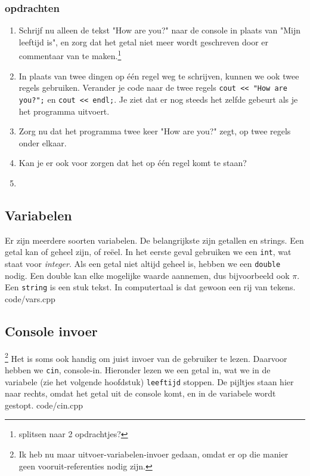 \documentclass[12pt,a4paper]{article}
\newcommand{\code}{}
\newcommand{\icode}{\lstinline}
\begin{document}
\subsubsection{opdrachten}
\begin{enumerate}
		\item
			Schrijf nu alleen de tekst "How are you?" naar de console in plaats van "Mijn leeftijd is", en zorg dat het getal niet meer wordt geschreven door er commentaar van te maken.\footnote{splitsen naar 2 opdrachtjes?}
		\item
			In plaats van twee dingen op \'e\'en regel weg te schrijven, kunnen we ook twee regels gebruiken. Verander je code naar de twee regels \icode{cout << "How are you?";} en \icode{cout << endl;}. Je ziet dat er nog steeds het zelfde gebeurt als je het programma uitvoert.
		\item
			Zorg nu dat het programma twee keer "How are you?" zegt, op twee regels onder elkaar.
		\item
			Kan je er ook voor zorgen dat het op \'e\'en regel komt te staan?
		\item
\end{enumerate}

\subsection{Variabelen}
Er zijn meerdere soorten variabelen. De belangrijkste zijn getallen en strings. Een getal kan of geheel zijn, of re\"eel. In het eerste geval gebruiken we een \icode{int}, wat staat voor \emph{integer}. Als een getal niet altijd geheel is, hebben we een \icode{double} nodig. Een double kan elke mogelijke waarde aannemen, dus bijvoorbeeld ook $\pi$.\\
Een \icode{string} is een stuk tekst. In computertaal is dat gewoon een rij van tekens.
\code{code/vars.cpp}
\subsection{Console invoer}\footnote{Ik heb nu maar uitvoer-variabelen-invoer gedaan, omdat er op die manier geen vooruit-referenties nodig zijn.}
Het is soms ook handig om juist invoer van de gebruiker te lezen. Daarvoor hebben we \icode{cin}, console-in. Hieronder lezen we een getal in, wat we in de variabele (zie het volgende hoofdstuk) \icode{leeftijd} stoppen. De pijltjes staan hier naar rechts, omdat het getal uit de console komt, en in de variabele wordt gestopt.
\code{code/cin.cpp}
\end{document}
